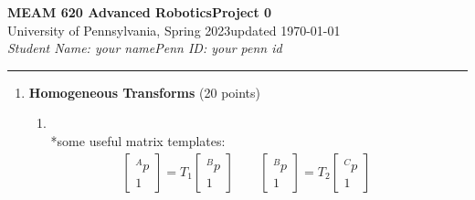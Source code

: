 \documentclass{article}
\begin{document}
\noindent
\textbf{MEAM 620 Advanced Robotics}\hfill\textbf{Project 0}\\
{University of Pennsylvania, Spring 2023}\hfill{updated \today}\\
\textit{Student Name: your name}\hfill{\textit{Penn ID: your penn id}}\\
\hrule\bigskip

\begin{enumerate}

\item \textbf{Homogeneous Transforms} (20 points)

\begin{enumerate}
    \item 
    
    \\
    *some useful matrix templates: 
    \begin{gather*}
    \begin{bmatrix}
    ^Ap\\1
    \end{bmatrix}=
    T_1
    \begin{bmatrix}
    ^Bp\\1
    \end{bmatrix}
    \qquad
    \begin{bmatrix}
    ^Bp\\1
    \end{bmatrix}=
    T_2
    \begin{bmatrix}
    ^Cp\\1
    \end{bmatrix}
    \qquad
\end{gather*}\\
    

\end{enumerate}
\end{enumerate}
\end{document}
